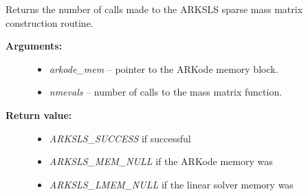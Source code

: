 \documentclass[letterpaper,10pt,english]{sphinxmanual}
\begin{document}
\begin{fulllineitems}
\label{c_interface/User_callable:c.ARKSlsGetNumMassEvals}
Returns the number of calls made to the ARKSLS sparse
mass matrix construction routine.
\begin{description}
\item[{\textbf{Arguments:}}] \leavevmode\begin{itemize}
\item {} 
\emph{arkode\_mem} -- pointer to the ARKode memory block.

\item {} 
\emph{nmevals} -- number of calls to the mass matrix function.

\end{itemize}

\item[{\textbf{Return value:}}] \leavevmode\begin{itemize}
\item {} 
\emph{ARKSLS\_SUCCESS} if successful

\item {} 
\emph{ARKSLS\_MEM\_NULL} if the ARKode memory was 

\item {} 
\emph{ARKSLS\_LMEM\_NULL} if the linear solver memory was 

\end{itemize}

\end{description}

\end{fulllineitems}

\end{document}
